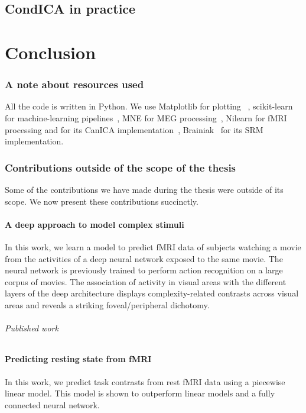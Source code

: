 \documentclass[ twoside,openright,titlepage,numbers=noenddot,%
                headinclude,footinclude,cleardoublepage=empty,abstract=on,
                BCOR=5mm,paper=a4,fontsize=11pt, 
                ]{scrreprt}
\begin{document}
\chapter{CondICA in practice}
\label{ch:condica2}


\part{Conclusion}

\section{A note about resources used}
All the code is written in Python.
We use Matplotlib for plotting~\cite{hunter2007matplotlib} , scikit-learn for
machine-learning pipelines~\cite{pedregosa2011scikit}, MNE for MEG
processing~\cite{gramfort2013meg}, Nilearn for fMRI processing and for its CanICA implementation~\cite{abraham2014machine}, Brainiak~\cite{kumar2020brainiak} for its SRM implementation. 


\section{Contributions outside of the scope of the thesis}
Some of the contributions we have made during the thesis were outside of its
scope. We now present these contributions succinctly.

\subsection{A deep approach to model complex stimuli}
In this work, we learn a model to predict fMRI data of subjects watching a movie
from the activities of a deep neural network exposed to the same movie. The neural network is previously trained to perform action recognition on a large corpus of movies.
The association of activity in visual areas with the different layers of the
deep architecture displays complexity-related contrasts across visual areas and
reveals a striking foveal/peripheral dichotomy.

\paragraph{Published work}

\subsection{Predicting resting state from fMRI}
In this work, we predict task contrasts from rest fMRI data using a piecewise
  linear model. This model is shown to outperform linear models and a fully
  connected neural network.
\end{document}
